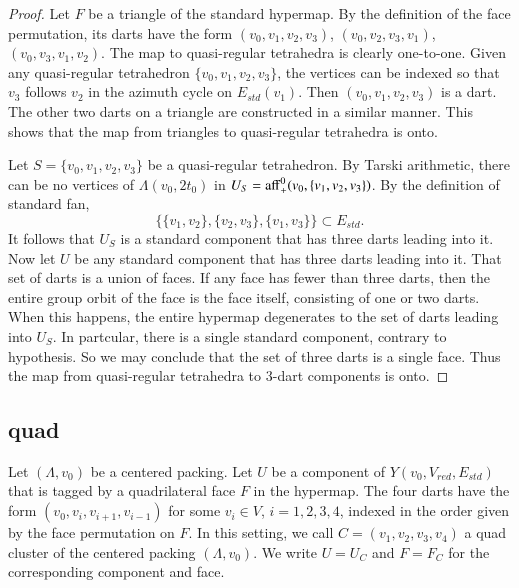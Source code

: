 \begin{proof}  Let $F$ be a triangle of the standard hypermap.
By the definition of the face permutation,
its darts have the form $(v_0,v_1,v_2,v_3)$,
$(v_0,v_2,v_3,v_1)$, $(v_0,v_3,v_1,v_2)$.  The map to quasi-regular
tetrahedra is clearly one-to-one.  Given any quasi-regular tetrahedron
$\{v_0,v_1,v_2,v_3\}$, the vertices can be indexed so that
$v_3$ follows $v_2$ in the azimuth cycle on $E_{std}(v_1)$.  Then
$(v_0,v_1,v_2,v_3)$ is a dart.  The other two darts on a triangle
are constructed in a similar manner.  This shows that the map from
triangles to quasi-regular tetrahedra is onto.

Let $S=\{v_0,v_1,v_2,v_3\}$ be a quasi-regular tetrahedron.  
By Tarski arithmetic, there
can be no vertices of $\Lambda(v_0,2t_0)$ in $U_S={\operatorname{aff}}_+^0(v_0,\{v_1,v_2,v_3\})$.
By the definition of standard fan,
  $$
  \{\{v_1,v_2\},\{v_2,v_3\},\{v_1,v_3\}\} \subset E_{std}.
  $$
It follows that $U_S$ is a standard component that has three darts
leading into it.  Now let $U$ be any standard component that has
three darts leading into it.  That set of darts is a union of faces.
If any face has fewer than three darts, then the entire group orbit
of the face is the face itself, consisting of one or two darts.
When this happens, the entire hypermap degenerates to the set of
darts leading into $U_S$.  In partcular, there is a single standard
component, contrary to hypothesis.  So we may conclude that the
set of three darts is a single face.  Thus the map from quasi-regular
tetrahedra to $3$-dart components is onto.
\end{proof}




\subsection{quad}
\label{sec:quad-class}


\begin{definition}
Let $(\Lambda,v_0)$ be a centered packing.  Let $U$ be a 
component of $Y(v_0,V_{red},E_{std})$
that is tagged by a quadrilateral face $F$
in the hypermap.
The 
four darts have the form $(v_0,v_i,v_{i+1},v_{i-1})$ for some $v_i\in V$,
$i=1,2,3,4$,  indexed in the order given
by the face permutation on $F$.   In this setting, we call 
$C=(v_1,v_2,v_3,v_4)$ a quad cluster of the centered packing $(\Lambda,v_0)$.
We write
$U = U_C$ and $F= F_C$ for the corresponding component and face.
\end{definition}



